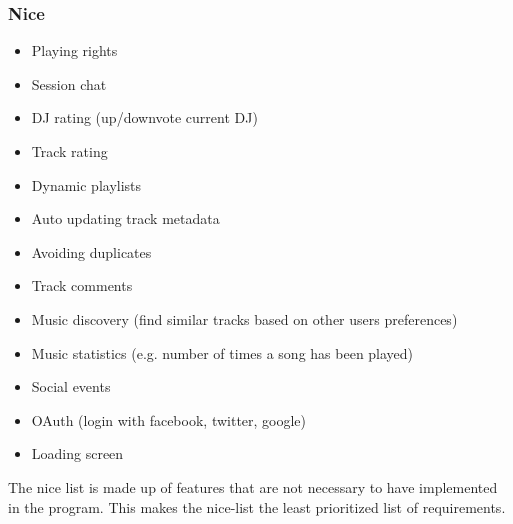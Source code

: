 \subsubsection{Nice}


\begin{itemize}
	\item Playing rights 
	\item Session chat
	\item DJ rating (up/downvote current DJ)
	\item Track rating
	\item Dynamic playlists
	\item Auto updating track metadata
	\item Avoiding duplicates
	\item Track comments
	\item Music discovery (find similar tracks based on other users preferences)
	\item Music statistics (e.g. number of times a song has been played) 
	\item Social events
	\item OAuth (login with facebook, twitter, google)
	\item Loading screen
\end{itemize}


The nice list is made up of features that are not necessary to have implemented in the program. This makes the nice-list the least prioritized list of requirements.